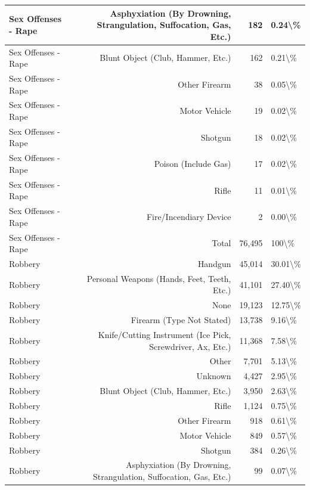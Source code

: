\documentclass[
]{krantz}
\begin{document}
\begin{longtable}[t]{l|r|r|l}
\hline
Sex Offenses - Rape & Asphyxiation (By Drowning, Strangulation, Suffocation, Gas, Etc.) & 182 & 0.24\textbackslash{}\%\\
\hline
Sex Offenses - Rape & Blunt Object (Club, Hammer, Etc.) & 162 & 0.21\textbackslash{}\%\\
\hline
Sex Offenses - Rape & Other Firearm & 38 & 0.05\textbackslash{}\%\\
\hline
Sex Offenses - Rape & Motor Vehicle & 19 & 0.02\textbackslash{}\%\\
\hline
Sex Offenses - Rape & Shotgun & 18 & 0.02\textbackslash{}\%\\
\hline
Sex Offenses - Rape & Poison (Include Gas) & 17 & 0.02\textbackslash{}\%\\
\hline
Sex Offenses - Rape & Rifle & 11 & 0.01\textbackslash{}\%\\
\hline
Sex Offenses - Rape & Fire/Incendiary Device & 2 & 0.00\textbackslash{}\%\\
\hline
Sex Offenses - Rape & Total & 76,495 & 100\textbackslash{}\%\\
\hline
Robbery & Handgun & 45,014 & 30.01\textbackslash{}\%\\
\hline
Robbery & Personal Weapons (Hands, Feet, Teeth, Etc.) & 41,101 & 27.40\textbackslash{}\%\\
\hline
Robbery & None & 19,123 & 12.75\textbackslash{}\%\\
\hline
Robbery & Firearm (Type Not Stated) & 13,738 & 9.16\textbackslash{}\%\\
\hline
Robbery & Knife/Cutting Instrument (Ice Pick, Screwdriver, Ax, Etc.) & 11,368 & 7.58\textbackslash{}\%\\
\hline
Robbery & Other & 7,701 & 5.13\textbackslash{}\%\\
\hline
Robbery & Unknown & 4,427 & 2.95\textbackslash{}\%\\
\hline
Robbery & Blunt Object (Club, Hammer, Etc.) & 3,950 & 2.63\textbackslash{}\%\\
\hline
Robbery & Rifle & 1,124 & 0.75\textbackslash{}\%\\
\hline
Robbery & Other Firearm & 918 & 0.61\textbackslash{}\%\\
\hline
Robbery & Motor Vehicle & 849 & 0.57\textbackslash{}\%\\
\hline
Robbery & Shotgun & 384 & 0.26\textbackslash{}\%\\
\hline
Robbery & Asphyxiation (By Drowning, Strangulation, Suffocation, Gas, Etc.) & 99 & 0.07\textbackslash{}\%\\
\hline

\end{longtable}
\end{document}
